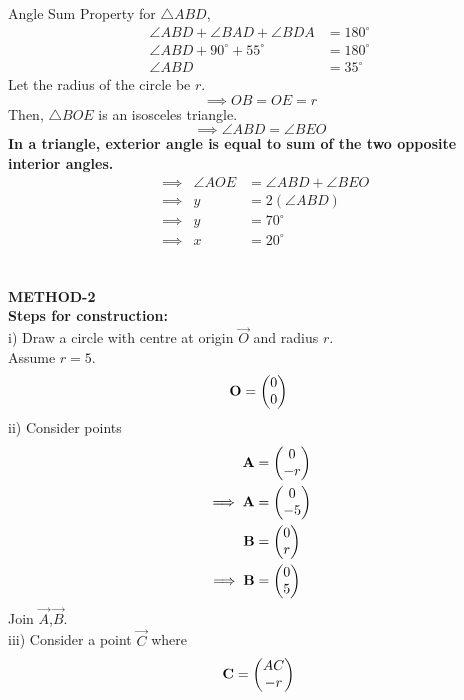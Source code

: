 \documentclass[journal,12pt,twocolumn]{IEEEtran}
\begin{document}
               
Angle Sum Property for $\triangle ABD$,    
\begin{align}
               \angle ABD+\angle BAD+\angle BDA&=180^\circ\\
               \angle ABD+90^\circ+55^\circ&=180^\circ\\
               \angle ABD&=35^\circ
 \end{align}  
 Let the radius of the circle be $r$.\\

 \begin {equation} 
\implies OB=OE=r
\end{equation} 
Then, $\triangle BOE$ is an isosceles triangle.\\
 \begin{equation} 
 \implies \angle ABD=\angle BEO
 \end{equation}  
\textbf{In a triangle, exterior angle is equal to sum of the two opposite interior angles.}\\
\begin{align}
&\implies &\angle AOE&=\angle ABD+\angle BEO\\
&\implies &y&=2(\angle ABD)\\
&\implies &y&=70^\circ\\
&\implies &x&=20^\circ
\end{align}  
\\\\
\textbf{METHOD-2}\\
\textbf{Steps for construction:}\\
i) Draw a circle with centre at origin $\vec{O}$ and radius $r$.\\
      Assume $r=5$.
\begin{equation}
\mathbf{O}= \begin{pmatrix}0\\0\end{pmatrix}\\
\end{equation}
ii) Consider points 
\begin{align}
\mathbf A&=\begin{pmatrix}0\\-r\end{pmatrix}\\
\implies \mathbf A &= \begin{pmatrix}0\\-5\end{pmatrix}\\
\mathbf B&=\begin{pmatrix}0\\r\end{pmatrix}\\
\implies \mathbf B &= \begin{pmatrix}0\\5\end{pmatrix}
\end{align}
Join $\vec A$,$\vec B$.\\
iii) Consider a point $\vec C$ where
\begin{equation}
\mathbf C=\begin{pmatrix}AC\\-r\end{pmatrix}\\
\end{equation}
\end{document}
